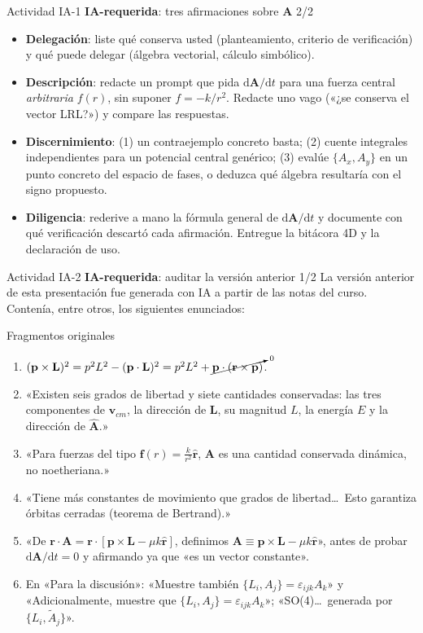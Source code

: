 \documentclass[aspectratio=169]{beamer}
\newcommand{\dd}{\mathrm{d}}
\newcommand{\vr}{\mathbf r}
\newcommand{\vp}{\mathbf p}
\newcommand{\vA}{\mathbf A}
\newcommand{\rh}{\hat{\mathbf r}}
\newcommand{\PB}[2]{\{#1,#2\}}
\newcommand{\IArequerida}{\colorbox{green!20}{\scriptsize\textbf{IA-requerida}}}
\begin{document}
\begin{frame}{Actividad IA-1 \IArequerida: tres afirmaciones sobre $\vA$ 2/2}
\begin{itemize}
  \item<1-> \textbf{Delegación}: liste qué conserva usted (planteamiento, criterio de
        verificación) y qué puede delegar (álgebra vectorial, cálculo simbólico).
  \item<2-> \textbf{Descripción}: redacte un prompt que pida $\dd\vA/\dd t$ para una fuerza
        central \emph{arbitraria} $f(r)$, sin suponer $f=-k/r^{2}$. Redacte uno vago
        («¿se conserva el vector LRL?») y compare las respuestas.
  \item<3-> \textbf{Discernimiento}: (1) un contraejemplo concreto basta; (2) cuente
        integrales independientes para un potencial central genérico; (3) evalúe
        $\PB{A_x}{A_y}$ en un punto concreto del espacio de fases, o deduzca qué álgebra
        resultaría con el signo propuesto.
  \item<4-> \textbf{Diligencia}: rederive a mano la fórmula general de $\dd\vA/\dd t$ y
        documente con qué verificación descartó cada afirmación.
        Entregue la bitácora 4D y la declaración de uso.
\end{itemize}
\end{frame}

\begin{frame}{Actividad IA-2 \IArequerida: auditar la versión anterior 1/2}
\footnotesize
La versión anterior de esta presentación fue generada con IA a partir de las notas del curso.
Contenía, entre otros, los siguientes enunciados:
\begin{exampleblock}{Fragmentos originales}
\begin{enumerate}
  \item[(a)] $(\vp\times\mathbf L)^{2}=p^{2}L^{2}-(\vp\cdot\mathbf L)^{2}
        =p^{2}L^{2}+\cancelto{0}{\vp\cdot(\vr\times\vp)}$.
  \item[(b)] «Existen seis grados de libertad y siete cantidades conservadas: las tres
        componentes de $\mathbf v_{cm}$, la dirección de $\mathbf L$, su magnitud $L$, la energía
        $E$ y la dirección de $\hat{\vA}$.»
  \item[(c)] «Para fuerzas del tipo $\mathbf f(r)=\frac{k}{r^{2}}\rh$, $\vA$ es una cantidad
        conservada dinámica, no noetheriana.»
  \item[(d)] «Tiene más constantes de movimiento que grados de libertad\dots\ Esto garantiza
        órbitas cerradas (teorema de Bertrand).»
  \item[(e)] «De $\vr\cdot\vA=\vr\cdot[\vp\times\mathbf L-\mu k\rh]$, definimos
        $\vA\equiv\vp\times\mathbf L-\mu k\rh$», antes de probar $\dd\vA/\dd t=0$ y
        afirmando ya que «es un vector constante».
  \item[(f)] En «Para la discusión»: «Muestre también $\{L_i,A_j\}=\varepsilon_{ijk}A_k$» y
        «Adicionalmente, muestre que $\{L_i,A_j\}=\varepsilon_{ijk}A_k$»; «SO(4)\dots\ generada
        por $\{L_i,\tilde A_j\}$».
\end{enumerate}
\end{exampleblock}
\end{frame}
\end{document}

